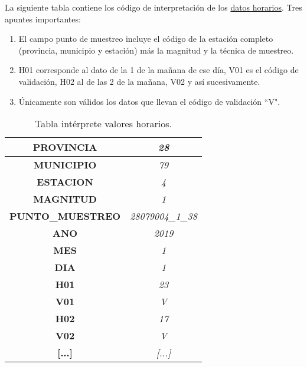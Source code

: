 La siguiente tabla contiene los código de interpretación de los \underline{datos horarios}. Tres apuntes importantes:

\begin{enumerate}
\item El campo punto de muestreo incluye el código de la estación completo (provincia, municipio y estación) más la magnitud y la técnica de muestreo.

\item H01 corresponde al dato de la 1 de la mañana de ese día, V01 es el código de validación, H02 al de las 2 de la mañana, V02 y así sucesivamente.

\item Únicamente son válidos los datos que llevan el código de validación “V".
\end{enumerate}


\begin{table}[H]
	\begin{center}
		\begin{tabular}{|c|c|}
			\hline
			\textbf{PROVINCIA}       & \textit{28}              \\ \hline
			\textbf{MUNICIPIO}       & \textit{79}              \\ \hline
			\textbf{ESTACION}        & \textit{4}               \\ \hline
			\textbf{MAGNITUD}        & \textit{1}               \\ \hline
			\textbf{PUNTO\_MUESTREO} & \textit{28079004\_1\_38} \\ \hline
			\textbf{ANO}             & \textit{2019}            \\ \hline
			\textbf{MES}             & \textit{1}               \\ \hline
			\textbf{DIA}             & \textit{1}               \\ \hline
			\textbf{H01}             & \textit{23}              \\ \hline
			\textbf{V01}             & \textit{V}               \\ \hline
			\textbf{H02}             & \textit{17}              \\ \hline
			\textbf{V02}             & \textit{V}               \\ \hline
			\textbf{[...]}             & \textit{[...]}               \\ \hline
		\end{tabular}
		\caption{Tabla intérprete valores horarios.}
	\end{center}
\end{table}

